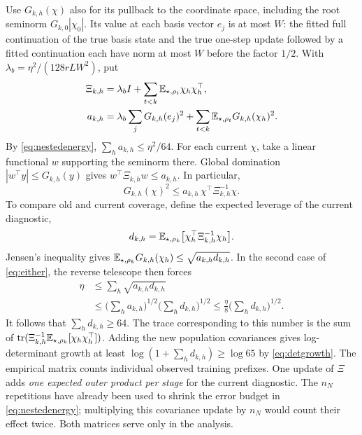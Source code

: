 Use $G_{k,h}(\chi)$ also for its pullback to the coordinate space, including the root seminorm $G_{k,0}|\chi_0|$. Its value at each basis vector $e_j$ is at most $W$: the fitted full continuation of the true basis state and the true one-step update followed by a fitted continuation each have norm at most $W$ before the factor $1/2$. With $\lambda_b=\eta^2/(128rLW^2)$, put
\begin{align*}
 \Xi_{k,h}&=\lambda_b I+\sum_{t<k}\mathbb E_{\star,\rho_t}\chi_h\chi_h^\top,
 \\
 a_{k,h}&=\lambda_b\sum_j G_{k,h}(e_j)^2+
       \sum_{t<k}\mathbb E_{\star,\rho_t}G_{k,h}(\chi_h)^2 .
\end{align*}
By \eqref{eq:nestedenergy}, $\sum_h a_{k,h}\le\eta^2/64$. For each current $\chi$, take a linear functional $w$ supporting the seminorm there. Global domination $|w^\top y|\le G_{k,h}(y)$ gives $w^\top\Xi_{k,h}w\le a_{k,h}$. In particular,
\[
 G_{k,h}(\chi)^2\le a_{k,h}\,\chi^\top\Xi_{k,h}^{-1}\chi.
\]
To compare old and current coverage, define the expected leverage of the current diagnostic,
\[
 d_{k,h}=\mathbb E_{\star,\rho_k}\big[\chi_h^\top\Xi_{k,h}^{-1}\chi_h\big].
\]
Jensen’s inequality gives $\mathbb E_{\star,\rho_k}G_{k,h}(\chi_h)\le\sqrt{a_{k,h}d_{k,h}}$. In the second case of \eqref{eq:either}, the reverse telescope then forces
\begin{align*}
 \eta
 &\le \sum_h\sqrt{a_{k,h}d_{k,h}}\\
 &\le\Big(\sum_h a_{k,h}\Big)^{1/2}
      \Big(\sum_h d_{k,h}\Big)^{1/2}
 \le \tfrac{\eta}{8}\Big(\sum_h d_{k,h}\Big)^{1/2}.
\end{align*}
It follows that $\sum_h d_{k,h}\ge64$. The trace corresponding to this number is the sum of $\operatorname{tr}(\Xi_{k,h}^{-1}\mathbb E_{\star,\rho_k}[\chi_h\chi_h^\top])$. Adding the new population covariances gives log-determinant growth at least $\log(1+\sum_h d_{k,h})\ge\log 65$ by \eqref{eq:detgrowth}. The empirical matrix counts individual observed training prefixes. One update of $\Xi$ adds \emph{one expected outer product per stage} for the current diagnostic. The $n_N$ repetitions have already been used to shrink the error budget in \eqref{eq:nestedenergy}; multiplying this covariance update by $n_N$ would count their effect twice. Both matrices serve only in the analysis.


